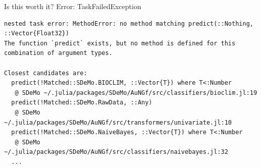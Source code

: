\documentclass[12pt, smalloffset, compress, aspectratio=1610]{beamer}
\begin{document}
\begin{frame}[fragile]{Is this worth it?}
\label{is-this-worth-it}
Error: TaskFailedException

\begin{verbatim}
nested task error: MethodError: no method matching predict(::Nothing, ::Vector{Float32})
The function `predict` exists, but no method is defined for this combination of argument types.

Closest candidates are:
  predict(!Matched::SDeMo.BIOCLIM, ::Vector{T}) where T<:Number
   @ SDeMo ~/.julia/packages/SDeMo/AuNGf/src/classifiers/bioclim.jl:19
  predict(!Matched::SDeMo.RawData, ::Any)
   @ SDeMo ~/.julia/packages/SDeMo/AuNGf/src/transformers/univariate.jl:10
  predict(!Matched::SDeMo.NaiveBayes, ::Vector{T}) where T<:Number
   @ SDeMo ~/.julia/packages/SDeMo/AuNGf/src/classifiers/naivebayes.jl:32
  ...


\end{verbatim}
\end{frame}
\end{document}

